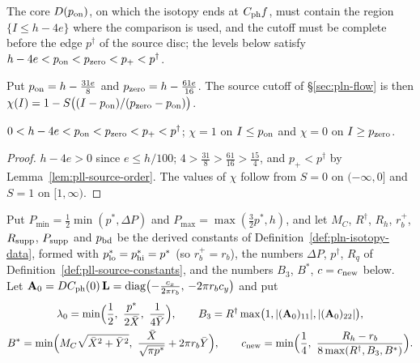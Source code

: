 The core $D(p_{\rm on})$, on which the isotopy ends at $C_{\rm ph}f$, must contain the region $\{I\le h-4e\}$ where the
comparison is used, and the cutoff must be complete before the edge $p^\dagger$ of the source disc; the levels below
satisfy $h-4e<p_{\rm on}<p_{\rm zero}<p_+<p^\dagger$.

\begin{definition}\label{def:pll-cutoff}
Put $p_{\rm on}=h-\frac{31e}8$ and $p_{\rm zero}=h-\frac{61e}{16}$. The source cutoff of \S\ref{sec:pln-flow} is
then $\chi(I)=1-S\bigl((I-p_{\rm on})/(p_{\rm zero}-p_{\rm on})\bigr)$.
\end{definition}

\begin{lemma}\label{lem:pll-cutoff}
$0<h-4e<p_{\rm on}<p_{\rm zero}<p_+<p^\dagger$; $\chi=1$ on $I\le p_{\rm on}$ and $\chi=0$ on $I\ge p_{\rm zero}$.
\end{lemma}

\begin{proof}
$h-4e>0$ since $e\le h/100$; $4>\frac{31}8>\frac{61}{16}>\frac{15}4$, and $p_+<p^\dagger$ by
Lemma~\ref{lem:pll-source-order}. The values of $\chi$ follow from $S=0$ on $(-\infty,0]$ and $S=1$ on $[1,\infty)$.
\end{proof}

\begin{definition}\label{def:pll-path-constants}
Put $P_{\min}=\frac12\min(p^*,\Delta P)$ and $P_{\max}=\max(\frac32p^*,h)$, and let $M_C$, $R^\dagger$, $R_h$, $r_b^+$,
$R_{\rm supp}$, $P_{\rm supp}$ and $p_{\rm bd}$ be the derived constants of Definition~\ref{def:pln-isotopy-data}, formed
with $p^*_{\rm lo}=p^*_{\rm hi}=p^*$ (so $r_b^+=r_b$), the numbers $\Delta P$, $p^\dagger$, $R_q$ of
Definition~\ref{def:pll-source-constants}, and the numbers $B_3$, $B^*$, $c=c_{\rm new}$ below. Let $\mathbf A_0=DC_{\rm ph}(0)\,\mathbf L=\operatorname{diag}\bigl(-\frac{c_x}{2\pi r_b},\,-2\pi r_bc_y\bigr)$
and put
\begin{gather*}
 \lambda_0=\min\Bigl(\frac12,\ \frac{p^*}{2\bar X},\ \frac1{4\bar Y}\Bigr),\qquad
 B_3=R^\dagger\max\bigl(1,|(\mathbf A_0)_{11}|,|(\mathbf A_0)_{22}|\bigr),\\
 B^*=\min\Bigl(M_C\sqrt{\bar X^2+\bar Y^2},\ \frac{\bar X}{\sqrt{\pi p^*}}+2\pi r_b\bar Y\Bigr),\qquad
 c_{\rm new}=\min\Bigl(\frac14,\ \frac{R_h-r_b}{8\max(R^\dagger,B_3,B^*)}\Bigr).
\end{gather*}
\end{definition}

